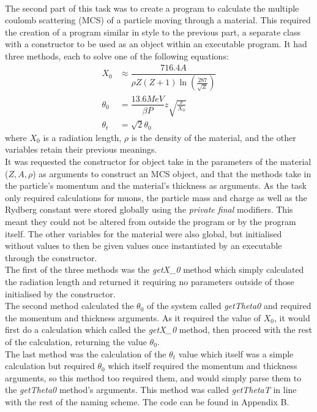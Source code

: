 \documentclass[twocolumn]{article}
\begin{document}
\\ \indent The second part of this task was to create a program to calculate the multiple coulomb scattering (MCS) of a particle moving through a material. This required the creation of a program similar in style to the previous part, a separate class with a constructor to be used as an object within an executable program. It had three methods, each to solve one of the following equations: 
	\begin{align}
	X_0 &\approx \dfrac{716.4A}{\rho Z(Z+1)  \ln{(\frac{287}{\sqrt{Z}})}} \\ 
	\theta_0 &= \dfrac{13.6 MeV}{\beta P}z\sqrt{\frac{x}{X_0}} \\
	\theta_t &= \sqrt{2}\theta_0
	\end{align}
where $X_0$ is a radiation length, $\rho$ is the density of the material, and the other variables retain their previous meanings. \\ \indent It was requested the constructor for object take in the parameters of the material ($Z,A,\rho$) as arguments to construct an MCS object, and that the methods take in the particle's momentum and the material's thickness as arguments. As the task only required calculations for muons, the particle mass and charge as well as the Rydberg constant were stored globally using the \textit{private final} modifiers. This meant they could not be altered from outside the program or by the program itself. The other variables for the material were also global, but initialised without values to then be given values once instantiated by an executable through the constructor. \\ \indent The first of the three methods was the \textit{getX\_0} method which simply calculated the radiation length and returned it requiring no parameters outside of those initialised by the constructor. \\\indent The second method calculated the $\theta_0$ of the system called \textit{getTheta0} and required the momentum and thickness arguments. As it required the value of $X_0$, it would first do a calculation which called the \textit{getX\_0} method, then proceed with the rest of the calculation, returning the value $\theta_0$. \\\indent The last method was the calculation of the $\theta_t$ value which itself was a simple calculation but required $\theta_0$ which itself required the momentum and thickness arguments, so this method too required them, and would simply parse them to the \textit{getTheta0} method's arguments. This method was called \textit{getThetaT} in line with the rest of the naming scheme. The code can be found in Appendix B.
\end{document}

